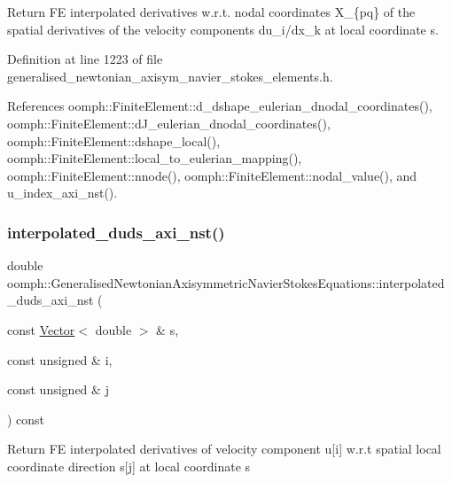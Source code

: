 Return FE interpolated derivatives w.\+r.\+t. nodal coordinates X\+\_\+\{pq\} of the spatial derivatives of the velocity components du\+\_\+i/dx\+\_\+k at local coordinate s. 



Definition at line 1223 of file generalised\+\_\+newtonian\+\_\+axisym\+\_\+navier\+\_\+stokes\+\_\+elements.\+h.



References oomph\+::\+Finite\+Element\+::d\+\_\+dshape\+\_\+eulerian\+\_\+dnodal\+\_\+coordinates(), oomph\+::\+Finite\+Element\+::d\+J\+\_\+eulerian\+\_\+dnodal\+\_\+coordinates(), oomph\+::\+Finite\+Element\+::dshape\+\_\+local(), oomph\+::\+Finite\+Element\+::local\+\_\+to\+\_\+eulerian\+\_\+mapping(), oomph\+::\+Finite\+Element\+::nnode(), oomph\+::\+Finite\+Element\+::nodal\+\_\+value(), and u\+\_\+index\+\_\+axi\+\_\+nst().

\mbox{\label{classoomph_1_1GeneralisedNewtonianAxisymmetricNavierStokesEquations_a9e2b946286e21282b9332de43c3d7e51}} 
\subsubsection{\texorpdfstring{interpolated\+\_\+duds\+\_\+axi\+\_\+nst()}{interpolated\_duds\_axi\_nst()}}
{\footnotesize\ttfamily double oomph\+::\+Generalised\+Newtonian\+Axisymmetric\+Navier\+Stokes\+Equations\+::interpolated\+\_\+duds\+\_\+axi\+\_\+nst (\begin{DoxyParamCaption}\item[{const \hyperlink{classoomph_1_1Vector}{Vector}$<$ double $>$ \&}]{s,  }\item[{const unsigned \&}]{i,  }\item[{const unsigned \&}]{j }\end{DoxyParamCaption}) const\hspace{0.3cm}{\ttfamily [inline]}}

Return FE interpolated derivatives of velocity component u\mbox{[}i\mbox{]} w.\+r.\+t spatial local coordinate direction s\mbox{[}j\mbox{]} at local coordinate s 


